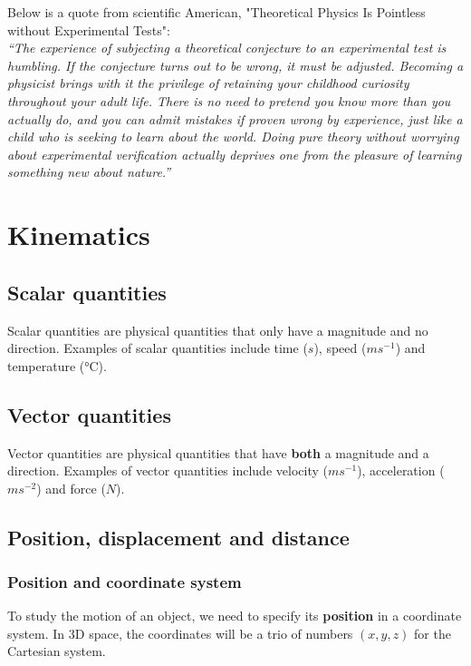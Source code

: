 \documentclass[11pt]{article}
\begin{document}
Below is a quote from scientific American, "Theoretical Physics Is Pointless without Experimental Tests":
\\[0pt]

\emph{“The experience of subjecting a theoretical conjecture to an experimental test is humbling. If the conjecture turns out to be wrong, it must be adjusted. Becoming a physicist brings with it the privilege of retaining your childhood curiosity throughout your adult life. There is no need to pretend you know more than you actually do, and you can admit mistakes if proven wrong by experience, just like a child who is seeking to learn about the world. Doing pure theory without worrying about experimental verification actually deprives one from the pleasure of learning something new about nature.”}


\section{Kinematics}
\label{sec:orga4e4929}

\subsection{Scalar quantities}
\label{sec:org03df333}
Scalar quantities are physical quantities that only have a magnitude and no direction. Examples of scalar quantities include time (\(\si{s}\)), speed (\(\si{ms^{-1}}\)) and temperature (\(\si{\celsius}\)).

\subsection{Vector quantities}
\label{sec:org173dc48}
Vector quantities are physical quantities that have \textbf{both} a magnitude and a direction. Examples of vector quantities include velocity (\(\si{ms^{-1}}\)), acceleration (\(\si{ms^{-2}}\)) and force (\(\si{N}\)).

\subsection{Position, displacement and distance}
\label{sec:orgd86a2fd}

\subsubsection{Position and coordinate system}
\label{sec:orgdf99316}
To study the motion of an object, we need to specify its \textbf{position} in a coordinate system. In 3D space, the coordinates will be a trio of numbers \((x, y, z)\) for the Cartesian system.
\end{document}
